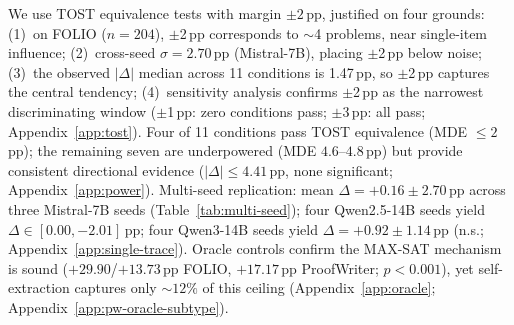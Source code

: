  We use TOST equivalence tests \citep{lakens2017equivalence} with margin $\pm 2$\,pp, justified on four grounds: (1)~on FOLIO ($n{=}204$), $\pm$2\,pp corresponds to ${\sim}$4 problems, near single-item influence; (2)~cross-seed $\sigma = 2.70$\,pp (Mistral-7B), placing $\pm$2\,pp below noise; (3)~the observed $|\Delta|$ median across 11 conditions is 1.47\,pp, so $\pm$2\,pp captures the central tendency; (4)~sensitivity analysis confirms $\pm$2\,pp as the narrowest discriminating window ($\pm$1\,pp: zero conditions pass; $\pm$3\,pp: all pass; Appendix~\ref{app:tost}). Four of 11 conditions pass TOST equivalence (MDE $\leq 2$\,pp); the remaining seven are underpowered (MDE $4.6$--$4.8$\,pp) but provide consistent directional evidence ($|\Delta| \leq 4.41$\,pp, none significant; Appendix~\ref{app:power}). Multi-seed replication: mean $\Delta = +0.16 \pm 2.70$\,pp across three Mistral-7B seeds (Table~\ref{tab:multi-seed}); four Qwen2.5-14B seeds yield $\Delta \in [0.00, -2.01]$\,pp; four Qwen3-14B seeds yield $\Delta = +0.92 \pm 1.14$\,pp (n.s.; Appendix~\ref{app:single-trace}). Oracle controls confirm the MAX-SAT mechanism is sound ($+29.90$/$+13.73$\,pp FOLIO, $+17.17$\,pp ProofWriter; $p < 0.001$), yet self-extraction captures only ${\sim}12\%$ of this ceiling (Appendix~\ref{app:oracle}; Appendix~\ref{app:pw-oracle-subtype}).
